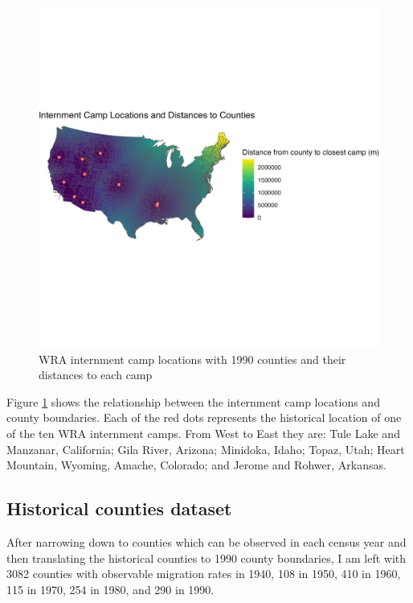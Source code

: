 \documentclass[12pt]{article}
\begin{document}
\begin{figure}[H]
    \centering
    \includegraphics[width=1.0\textwidth]{figures/countymap.png}
    \caption{WRA internment camp locations with 1990 counties and their distances to each camp}
    \label{fig:countymap}
\end{figure}

Figure \ref{fig:countymap} shows the relationship between the internment camp locations and county boundaries. 
Each of the red dots represents the historical location of one of the ten WRA internment camps. 
From West to East they are:
Tule Lake and Manzanar, California;
Gila River, Arizona;
Minidoka, Idaho;
Topaz, Utah;
Heart Mountain, Wyoming,
Amache, Colorado;
and
Jerome and Rohwer, Arkansas.

\subsection{Historical counties
dataset}\label{historical-counties-dataset}


After narrowing down to counties which can be observed in each census
year and then translating the historical counties to 1990 county
boundaries, I am left with 3082 counties with observable migration rates
in 1940, 108 in 1950, 410 in 1960, 115 in 1970, 254 in 1980, and 290 in
1990.
\end{document}
